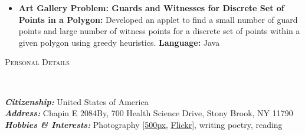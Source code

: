 \documentclass[11pt]{article}
\newenvironment{changemargin}[2]{%
  \begin{list}{}{%
    \setlength{\topsep}{0pt}%
    \setlength{\leftmargin}{#1}%
    \setlength{\rightmargin}{#2}%
    \setlength{\listparindent}{\parindent}%
    \setlength{\itemindent}{\parindent}%
    \setlength{\parsep}{\parskip}%
  }%
  \item[]}{\end{list}
}
\newcommand{\lineover}{
	\begin{changemargin}{-0.05in}{-0.05in}
		\vspace*{-8pt}
		\hrulefill \\
		\vspace*{-2pt}
	\end{changemargin}
}
\newcommand{\header}[1]{
	\begin{changemargin}{-0.5in}{-0.5in}
		\scshape{#1}\\
  	\lineover
	\end{changemargin}
}
\newenvironment{body} {
	\vspace*{-16pt}
	\begin{changemargin}{-0.25in}{-0.5in}
  }	
	{\end{changemargin}
}
\begin{document}
\begin{body}
\begin{itemize}
		\item \textbf{Art Gallery Problem: Guards and Witnesses for Discrete Set of Points in a Polygon:} Developed an applet to find a small number of guard points and large number of witness points for a discrete set of points within a given polygon using greedy heuristics. \textbf{Language:} Java\\
	\end{itemize}
\end{body}

\smallskip

\header{Personal Details}

\begin{body}
	\vspace{14pt}
	\textbf{\emph{Citizenship:}} United States of America\\
	\textbf{\emph{Address:}} Chapin E 2084By, 700 Health Science Drive, Stony Brook, NY 11790\\
	\textbf{\emph{Hobbies \& Interests:}} Photography [\href{http://500px.com/deadpoet88/}{500px}, \href{http://www.flickr.com/photos/deadpoet_42/}{Flickr}], writing poetry, reading\\

\end{body}

\smallskip


\end{document}
